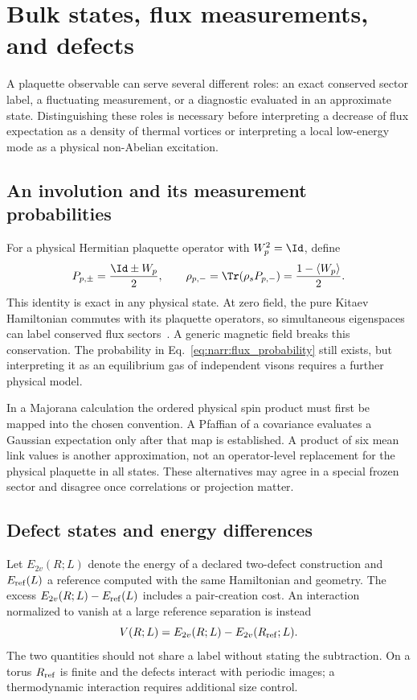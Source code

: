 \chapter{Bulk states, flux measurements, and defects}
\label{narr:defects}

A plaquette observable can serve several different roles: an exact conserved
sector label, a fluctuating measurement, or a diagnostic evaluated in an
approximate state. Distinguishing these roles is necessary before interpreting
a decrease of flux expectation as a density of thermal vortices or interpreting
a local low-energy mode as a physical non-Abelian excitation.

\section{An involution and its measurement probabilities}
For a physical Hermitian plaquette operator with $W_p^2=\Id$, define
\begin{equation}
 P_{p,\pm}=\frac{\Id\pm W_p}{2},\qquad
 \rho_{p,-}=\Tr(\rho_sP_{p,-})=\frac{1-\langle W_p\rangle}{2}.
 \label{eq:narr:flux_probability}
\end{equation}
This identity is exact in any physical state. At zero field, the pure Kitaev
Hamiltonian commutes with its plaquette operators, so simultaneous eigenspaces
can label conserved flux sectors~\cite{Kitaev2006}. A generic magnetic field
breaks this conservation. The probability in Eq.~\eqref{eq:narr:flux_probability}
still exists, but interpreting it as an equilibrium gas of independent visons
requires a further physical model.

In a Majorana calculation the ordered physical spin product must first be
mapped into the chosen convention. A Pfaffian of a covariance evaluates a
Gaussian expectation only after that map is established. A product of six
mean link values is another approximation, not an operator-level replacement
for the physical plaquette in all states. These alternatives may agree in a
special frozen sector and disagree once correlations or projection matter.

\section{Defect states and energy differences}
Let $E_{2v}(R;L)$ denote the energy of a declared two-defect construction and
$E_{\rm ref}(L)$ a reference computed with the same Hamiltonian and geometry.
The excess $E_{2v}(R;L)-E_{\rm ref}(L)$ includes a pair-creation cost. An interaction
normalized to vanish at a large reference separation is instead
\begin{equation}
 V(R;L)=E_{2v}(R;L)-E_{2v}(R_{\rm ref};L).
 \label{eq:narr:interaction}
\end{equation}
The two quantities should not share a label without stating the subtraction.
On a torus $R_{\rm ref}$ is finite and the defects interact with periodic images;
a thermodynamic interaction requires additional size control.


